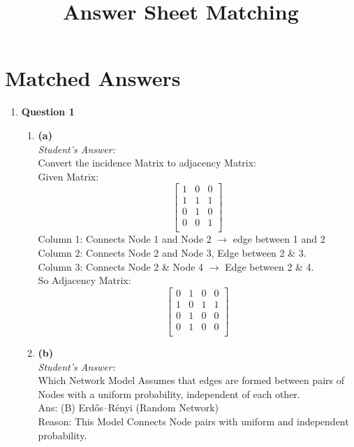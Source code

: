 \documentclass[a4paper,12pt]{article}
\title{Answer Sheet Matching}
\author{}
\date{}
\begin{document}
\maketitle

\section*{Matched Answers}

\begin{enumerate}
    \item \textbf{Question 1}
    \begin{enumerate}
        \item \textbf{(a)} \\
        \textit{Student's Answer:} \\
        Convert the incidence Matrix to adjacency Matrix: \\
        Given Matrix: \\
        \[
        \begin{bmatrix}
        1 & 0 & 0 \\
        1 & 1 & 1 \\
        0 & 1 & 0 \\
        0 & 0 & 1 \\
        \end{bmatrix}
        \]
        Column 1: Connects Node 1 and Node 2 $\rightarrow$ edge between 1 and 2 \\
        Column 2: Connects Node 2 and Node 3, Edge between 2 \& 3. \\
        Column 3: Connects Node 2 \& Node 4 $\rightarrow$ Edge between 2 \& 4. \\
        So Adjacency Matrix: \\
        \[
        \begin{bmatrix}
        0 & 1 & 0 & 0 \\
        1 & 0 & 1 & 1 \\
        0 & 1 & 0 & 0 \\
        0 & 1 & 0 & 0 \\
        \end{bmatrix}
        \]

        \item \textbf{(b)} \\
        \textit{Student's Answer:} \\
        Which Network Model Assumes that edges are formed between pairs of Nodes with a uniform probability, independent of each other. \\
        Ans: (B) Erdős–Rényi (Random Network) \\
        Reason: This Model Connects Node pairs with uniform and independent probability.


\end{enumerate}
\end{enumerate}
\end{document}
